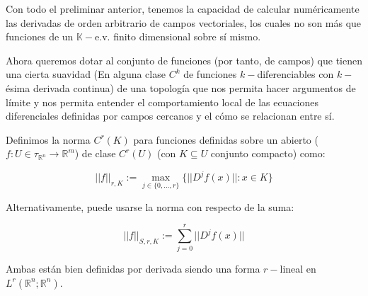 \begin{rmrk}
	Con todo el preliminar anterior, tenemos la capacidad de calcular numéricamente las derivadas de orden arbitrario de campos vectoriales, los cuales no son más que funciones de un $\mathbb{K}-$e.v. finito dimensional sobre sí mismo.
	
	Ahora queremos dotar al conjunto de funciones (por tanto, de campos) que tienen una cierta suavidad (En alguna clase $C^k$ de funciones $k-$diferenciables con $k-$ésima derivada continua) de una topología que nos permita hacer argumentos de límite y nos permita entender el comportamiento local de las ecuaciones diferenciales definidas por campos cercanos y el cómo se relacionan entre sí.
\end{rmrk}

\begin{defn}[Norma $C^r(K)$]
	Definimos la norma $C^r(K)$ para funciones definidas sobre un abierto ($f:U \in \tau_{\mathbb{R}^n} \to \mathbb{R}^m$) de clase $C^r(U)$ (con $K\subseteq U$ conjunto compacto) como:
	
	\begin{equation*}
		||f||_{r,K} := \max_{j \in \{0,...,r\}}\{||D^jf(x)||: x \in K\}
	\end{equation*}
	
	Alternativamente, puede usarse la norma con respecto de la suma:
	
	\begin{equation*}
		||f||_{S,r,K} := \sum_{j=0}^r ||D^jf(x)||
	\end{equation*}
	
	Ambas están bien definidas por derivada siendo una forma $r-$lineal en $L^r(\mathbb{R}^n;\mathbb{R}^n)$.
\end{defn}

